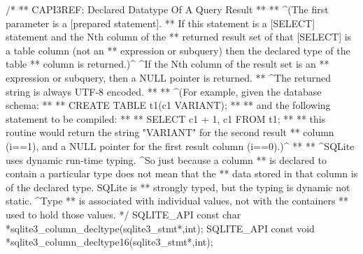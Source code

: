 \begin{Codex}[label=sqlite3.h,numbers=left]
{/*
** CAPI3REF: Declared Datatype Of A Query Result
**
** ^(The first parameter is a [prepared statement].
** If this statement is a [SELECT] statement and the Nth column of the
** returned result set of that [SELECT] is a table column (not an
** expression or subquery) then the declared type of the table
** column is returned.)^  ^If the Nth column of the result set is an
** expression or subquery, then a NULL pointer is returned.
** ^The returned string is always UTF-8 encoded.
**
** ^(For example, given the database schema:
**
** CREATE TABLE t1(c1 VARIANT);
**
** and the following statement to be compiled:
**
** SELECT c1 + 1, c1 FROM t1;
**
** this routine would return the string "VARIANT" for the second result
** column (i==1), and a NULL pointer for the first result column (i==0).)^
**
** ^SQLite uses dynamic run-time typing.  ^So just because a column
** is declared to contain a particular type does not mean that the
** data stored in that column is of the declared type.  SQLite is
** strongly typed, but the typing is dynamic not static.  ^Type
** is associated with individual values, not with the containers
** used to hold those values.
*/
SQLITE_API const char *sqlite3_column_decltype(sqlite3_stmt*,int);
SQLITE_API const void *sqlite3_column_decltype16(sqlite3_stmt*,int);

}
\end{Codex}
